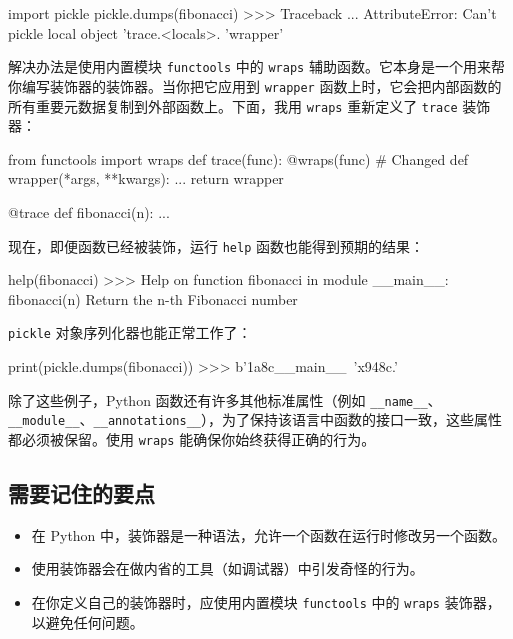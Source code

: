 \begin{codebox}[python]
import pickle
pickle.dumps(fibonacci)
>>>
Traceback ...
AttributeError: Can't pickle local object 'trace.<locals>.
'wrapper'
\end{codebox}

解决办法是使用内置模块 \texttt{functools} 中的 \texttt{wraps} 辅助函数。它本身是一个用来帮你编写装饰器的装饰器。当你把它应用到 \texttt{wrapper} 函数上时，它会把内部函数的所有重要元数据复制到外部函数上。下面，我用 \texttt{wraps} 重新定义了 \texttt{trace} 装饰器：

\begin{codebox}[python]
from functools import wraps
def trace(func):
    @wraps(func)  # Changed
    def wrapper(*args, **kwargs):
        ...
    return wrapper

@trace
def fibonacci(n):
    ...
\end{codebox}

现在，即便函数已经被装饰，运行 \texttt{help} 函数也能得到预期的结果：

\begin{codebox}[python]
help(fibonacci)
>>>
Help on function fibonacci in module __main__:
fibonacci(n)
    Return the n-th Fibonacci number
\end{codebox}

\texttt{pickle} 对象序列化器也能正常工作了：

\begin{codebox}[python]
print(pickle.dumps(fibonacci))
>>>
b'\x1a\x8c__main__\
'x94\x8c\tfibonacci{}.'
\end{codebox}

除了这些例子，Python 函数还有许多其他标准属性（例如 \texttt{\_\_name\_\_}、\texttt{\_\_module\_\_}、\texttt{\_\_annotations\_\_}），为了保持该语言中函数的接口一致，这些属性都必须被保留。使用 \texttt{wraps} 能确保你始终获得正确的行为。

\subsection{需要记住的要点}

\begin{itemize}
\item 在 Python 中，装饰器是一种语法，允许一个函数在运行时修改另一个函数。
\item 使用装饰器会在做内省的工具（如调试器）中引发奇怪的行为。
\item 在你定义自己的装饰器时，应使用内置模块 \texttt{functools} 中的 \texttt{wraps} 装饰器，以避免任何问题。
\end{itemize}

